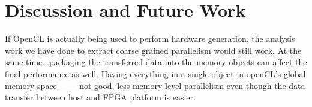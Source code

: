 \section{Discussion and Future Work}
If OpenCL is actually being used to perform hardware generation, the analysis work we have done to extract coarse grained parallelism would still work.
At the same time...packaging the transferred data into the memory objects can affect the final performance as well. Having everything in a single 
object in openCL's global memory space ------ not good, less memory level parallelism even though the data transfer between host and FPGA platform
is easier. 

